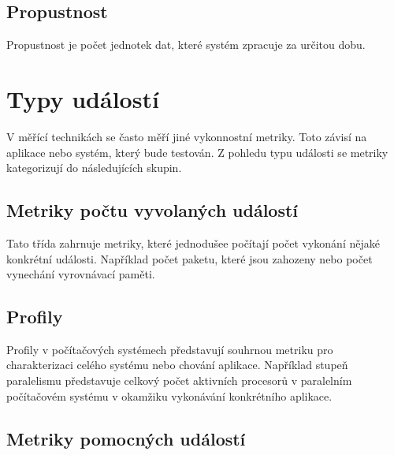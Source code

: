 \subsection*{Propustnost}

Propustnost je počet jednotek dat, které systém zpracuje za určitou dobu.

\section{Typy událostí}

V měřící technikách se často měří jiné vykonnostní metriky. Toto závisí na aplikace nebo systém, který bude testován. Z pohledu typu události se metriky kategorizují do následujících skupin.

\subsection*{Metriky počtu vyvolaných událostí}

Tato třída zahrnuje metriky, které jednodušee počítají počet vykonání nějaké konkrétní události. Například počet paketu, které jsou zahozeny nebo počet vynechání vyrovnávací paměti.

\subsection*{Profily}

Profily v počítačových systémech představují souhrnou metriku pro charakterizaci celého systému nebo chování aplikace. Například stupeň paralelismu představuje celkový počet aktivních procesorů v paralelním počítačovém systému v okamžiku vykonávání konkrétního aplikace.

\subsection*{Metriky pomocných událostí}

